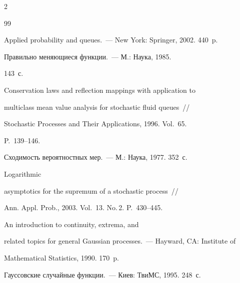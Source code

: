 \begin{multicols}{2}
{{\begin{thebibliography}{99}


  Applied probability and queues.~--- New York: Springer, 2002. 440~p.







 Правильно меняющиеся функции.~--- М.: Наука, 1985.


143~с.









Conservation laws and reflection mappings with application to


multiclass mean value analysis for stochastic fluid queues~// 


Stochastic Processes and Their Applications, 1996. Vol.~65.


P.~139--146.







 Сходимость вероятностных мер.~--- М.: Наука, 1977. 352~с.







 Logarithmic


asymptotics for the supremum of a stochastic process~// 


Ann. Appl. Prob., 2003. Vol.~13. No.\,2. P.~430--445.







 An introduction to continuity, extrema, and


related topics for general Gaussian processes.~--- Hayward, CA: Institute of 


Mathematical Statistics, 1990. 170~p.







 Гауссовские случайные функции.~--- Киев: ТвиМС, 1995. 248~с.









\end{thebibliography}}}
\end{multicols}
